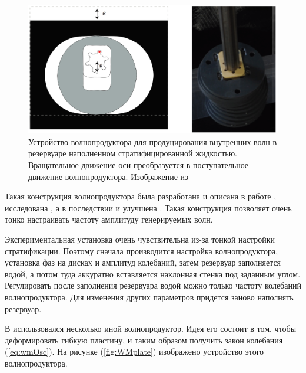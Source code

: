 \begin{figure}
    \centering
    \includegraphics[scale = 0.5]{pics/wawemakerScheme.png}
    \caption{Устройство волнопродуктора для продуцирования внутренних волн в резервуаре наполненном стратифицированной жидкостью. Вращательное движение оси преобразуется в поступательное движение волнопродуктора. Изображение из \cite{Bordes2012InteractionsND, bourget, phdthesisGW}}
    \label{fig:WMrot}
\end{figure}

Такая конструкция волнопродуктора была разработана и описана в работе \cite{Gostiaux2006}, исследована \cite{MERCIER2010}, а в последствии и улучшена \cite{Bordes2012InteractionsND}. Такая конструкция позволяет очень тонко настраивать частоту амплитуду генерируемых волн.

Экспериментальная установка очень чувствительна из-за тонкой настройки стратификации. Поэтому сначала производится настройка волнопродуктора, установка фаз на дисках и амплитуд колебаний, затем резервуар заполняется водой, а потом туда аккуратно вставляется наклонная стенка под заданным углом. Регулировать после заполнения резервуара водой можно только частоту колебаний волнопродуктора. Для изменения других параметров придется заново наполнять резервуар. 

В \cite{Brouzet_2016} использовался несколько иной волнопродуктор. Идея его состоит в том, чтобы деформировать гибкую пластину, и таким образом получить закон колебания (\ref{eq:wmOsc}). На рисунке (\ref{fig:WMplate}) изображено устройство этого волнопродуктора. 

